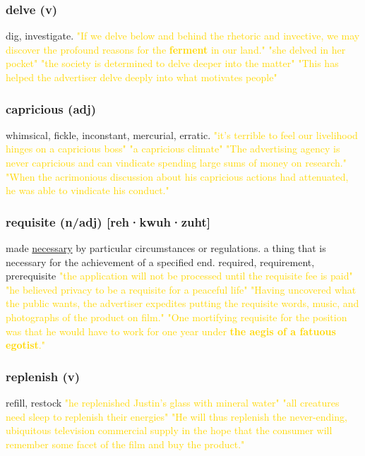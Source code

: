 \documentclass{proc}
\begin{document}
	\subsubsection{\textcolor{brickred}{delve} (v)}
	dig, investigate.
	\textcolor{gold}{"If we delve below and behind the rhetoric and invective, we may discover the profound reasons for the \textbf{ferment} in our land." "she delved in her pocket" "the society is determined to delve deeper into the matter" "This has helped the advertiser delve deeply into what motivates people"}
	
	\subsubsection{\textcolor{brickred}{capricious} (adj)}
	whimsical, fickle, inconstant, mercurial, erratic.
	\textcolor{gold}{"it's terrible to feel our livelihood hinges on a capricious boss" "a capricious climate" "The advertising agency is never capricious and can vindicate spending large sums of money on research." "When the acrimonious discussion about his capricious actions had attenuated, he was able to vindicate his conduct."}
	
	\subsubsection{\textcolor{brickred}{requisite} (n/adj) [reh·kwuh·zuht]}
	made \underline{necessary} by particular circumstances or regulations. a thing that is necessary for the achievement of a specified end. required, requirement, prerequisite
	\textcolor{gold}{"the application will not be processed until the requisite fee is paid" "he believed privacy to be a requisite for a peaceful life" "Having uncovered what the public wants, the advertiser expedites putting the requisite words, music, and photographs of the product on film." "One mortifying requisite for the position was that he would have to work for one year under \textbf{the aegis of a fatuous egotist}."}
	
	\subsubsection{\textcolor{brickred}{replenish} (v)}
	refill, restock
	\textcolor{gold}{"he replenished Justin's glass with mineral water" "all creatures need sleep to replenish their energies" "He will thus replenish the never-ending, ubiquitous television commercial supply in the hope that the consumer will remember some facet of the film and buy the product."}
	
\end{document}
